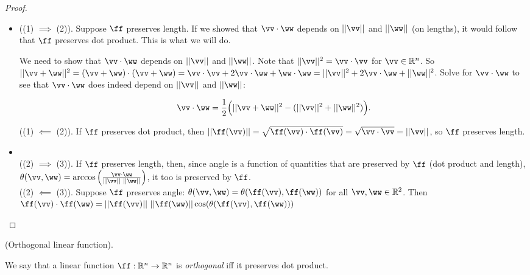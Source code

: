 \begin{proof}
    \mbox{} \\
    \begin{itemize}
        \item ((1) $\implies$ (2)). Suppose $\ff$ preserves length. If we showed that $\vv \cdot \ww$ depends on $||\vv||$ and $||\ww||$ (on lengths), it would follow that $\ff$ preserves dot product. This is what we will do.

        We need to show that $\vv \cdot \ww$ depends on $||\vv||$ and $||\ww||$. Note that $||\vv||^2 = \vv \cdot \vv$ for $\vv \in \R^n$. So \\ $||\vv + \ww||^2 = (\vv + \ww) \cdot (\vv + \ww) = \vv \cdot \vv + 2 \vv \cdot \ww + \ww \cdot \ww = ||\vv||^2 + 2 \vv \cdot \ww + ||\ww||^2$. Solve for $\vv \cdot \ww$ to see that $\vv \cdot \ww$ does indeed depend on $||\vv||$ and $||\ww||$:
        
       \begin{align*}
            \vv \cdot \ww = \frac{1}{2}\Big(||\vv + \ww||^2 - (||\vv||^2 + ||\ww||^2) \Big).
        \end{align*}
        
        ((1) $\impliedby$ (2)). If $\ff$ preserves dot product, then $||\ff(\vv)|| = \sqrt{\ff(\vv) \cdot \ff(\vv)} = \sqrt{\vv \cdot \vv} = ||\vv||$, so $\ff$ preserves length.
        
        \item \mbox{} \\
        ((2) $\implies$ (3)). If $\ff$ preserves length, then, since angle is a function of quantities that are preserved by $\ff$ (dot product and length), $\theta(\vv, \ww) = \arccos\Big( \frac{\vv \cdot \ww}{||\vv|| \spc ||\ww||} \Big)$, it too is preserved by $\ff$. \\
        
        ((2) $\impliedby$ (3)). Suppose $\ff$ preserves angle: $\theta(\vv, \ww) = \theta(\ff(\vv), \ff(\ww))$ for all $\vv, \ww \in \R^2$. Then $\ff(\vv) \cdot \ff(\ww) = ||\ff(\vv)|| \spc ||\ff(\ww)|| \cos(\theta(\ff(\vv), \ff(\ww)))$
    \end{itemize}
\end{proof}

\begin{defn}
\label{ch::lin_alg::defn::orthogonal_linear_fn_Rn}
    (Orthogonal linear function).
    
    We say that a linear function $\ff:\R^n \rightarrow \R^n$ is \textit{orthogonal} iff it preserves dot product.
\end{defn}

